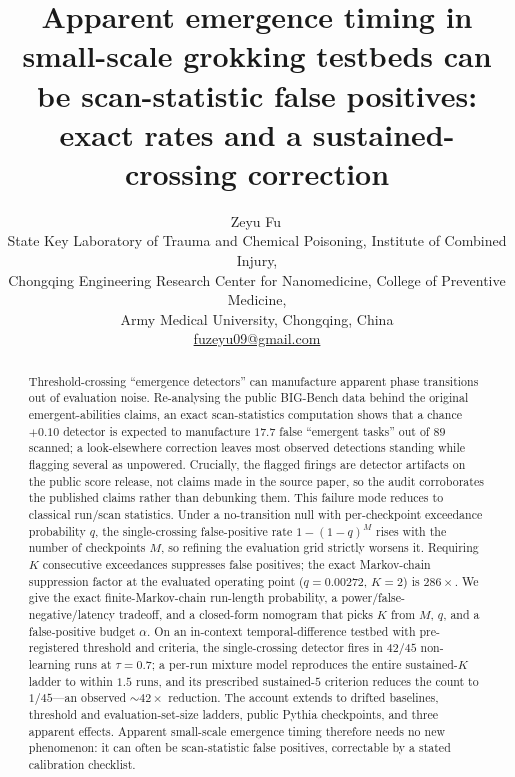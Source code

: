 \documentclass[11pt]{article}
\theoremstyle{plain}
\theoremstyle{definition}
\begin{document}
\title{Apparent emergence timing in small-scale grokking testbeds can be
scan-statistic false positives: exact rates and a sustained-crossing correction}
\author{Zeyu Fu\,\\
State Key Laboratory of Trauma and Chemical Poisoning, Institute of Combined Injury,\\
Chongqing Engineering Research Center for Nanomedicine, College of Preventive Medicine,\\
Army Medical University, Chongqing, China\\
\href{mailto:fuzeyu09@gmail.com}{fuzeyu09@gmail.com}}
\date{}

\maketitle

\begin{abstract}
Threshold-crossing ``emergence detectors'' can manufacture apparent phase transitions out
of evaluation noise. Re-analysing the public BIG-Bench data behind the original
emergent-abilities claims, an exact scan-statistics computation shows that a
chance$+0.10$ detector is expected to manufacture $17.7$ false ``emergent tasks'' out of
$89$ scanned; a look-elsewhere correction leaves most observed detections standing while
flagging several as unpowered. Crucially, the flagged firings are detector artifacts on
the public score release, not claims made in the source paper, so the audit corroborates
the published claims rather than debunking them. This failure mode reduces to classical
run/scan statistics. Under a no-transition null with per-checkpoint exceedance
probability $q$, the single-crossing false-positive rate $1-(1-q)^{M}$ rises with the
number of checkpoints $M$, so refining the evaluation grid strictly worsens it.
Requiring $K$ consecutive exceedances suppresses false positives; the exact Markov-chain
suppression factor at the evaluated operating point ($q=0.00272$, $K=2$) is $286\times$.
We give the exact finite-Markov-chain run-length probability, a
power/false-negative/latency tradeoff, and a closed-form nomogram that picks $K$ from
$M$, $q$, and a false-positive budget $\alpha$. On an in-context temporal-difference
testbed with pre-registered threshold and criteria, the single-crossing detector fires
in $42/45$ non-learning runs at $\tau=0.7$; a per-run mixture model reproduces the entire
sustained-$K$ ladder to within $1.5$ runs, and its prescribed sustained-$5$ criterion
reduces the count to $1/45$---an observed ${\sim}42\times$ reduction. The account extends
to drifted baselines, threshold and evaluation-set-size ladders, public Pythia
checkpoints, and three apparent effects. Apparent small-scale emergence timing therefore
needs no new phenomenon: it can often be scan-statistic false positives,
correctable by a stated calibration checklist.
\end{abstract}
\end{document}
